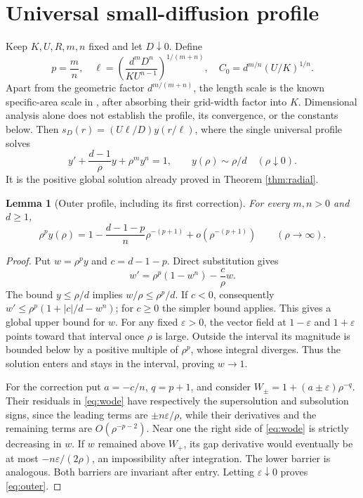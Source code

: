 \documentclass[11pt,a4paper]{article}
\newtheorem{lemma}[theorem]{Lemma}
\theoremstyle{definition}\newtheorem{definition}[theorem]{Definition}
\theoremstyle{remark}\newtheorem{remark}[theorem]{Remark}
\begin{document}
\section{Universal small-diffusion profile}
Keep $K,U,R,m,n$ fixed and let $D\downarrow0$. Define
\begin{equation}
 p=\frac mn,\quad
 \ell=\left(\frac{d^mD^n}{K U^{n-1}}\right)^{1/(m+n)},\quad
 C_0=d^{m/n}(U/K)^{1/n}.\label{eq:scales}
\end{equation}
Apart from the geometric factor $d^{m/(m+n)}$, the length scale is the known specific-area scale in \cite[Eq.~17]{Litwin2025}, after absorbing their grid-width factor into $K$. Dimensional analysis alone does not establish the profile, its convergence, or the constants below. Then $s_D(r)=(U\ell/D)y(r/\ell)$, where the single universal profile solves
\begin{equation}
 y'+\frac{d-1}{\rho}y+\rho^m y^n=1,\qquad
 y(\rho)\sim\rho/d\quad(\rho\downarrow0).\label{eq:universal}
\end{equation}
It is the positive global solution already proved in Theorem \ref{thm:radial}.

\begin{lemma}[Outer profile, including its first correction]\label{lem:outer}
For every $m,n>0$ and $d\geq1$,
\begin{equation}
 \rho^p y(\rho)=1-\frac{d-1-p}{n}\rho^{-(p+1)}
       +o(\rho^{-(p+1)})\qquad(\rho\to\infty).\label{eq:outer}
\end{equation}
\end{lemma}
\begin{proof}
Put $w=\rho^p y$ and $c=d-1-p$. Direct substitution gives
\begin{equation}
 w'=\rho^p(1-w^n)-\frac c\rho w.\label{eq:wode}
\end{equation}
The bound $y\leq\rho/d$ implies $w/\rho\leq\rho^p/d$. If $c<0$, consequently
$w'\leq\rho^p(1+|c|/d-w^n)$; for $c\geq0$ the simpler bound applies. This gives a global upper bound for $w$. For any fixed $\varepsilon>0$, the vector field at $1-\varepsilon$ and $1+\varepsilon$ points toward that interval once $\rho$ is large. Outside the interval its magnitude is bounded below by a positive multiple of $\rho^p$, whose integral diverges. Thus the solution enters and stays in the interval, proving $w\to1$.

For the correction put $a=-c/n$, $q=p+1$, and consider
$W_\pm=1+(a\pm\varepsilon)\rho^{-q}$. Their residuals in \eqref{eq:wode} have respectively the supersolution and subsolution signs, since the leading terms are $\pm n\varepsilon/\rho$, while their derivatives and the remaining terms are $O(\rho^{-p-2})$. Near one the right side of \eqref{eq:wode} is strictly decreasing in $w$. If $w$ remained above $W_+$, its gap derivative would eventually be at most $-n\varepsilon/(2\rho)$, an impossibility after integration. The lower barrier is analogous. Both barriers are invariant after entry. Letting $\varepsilon\downarrow0$ proves \eqref{eq:outer}.
\end{proof}
\end{document}
